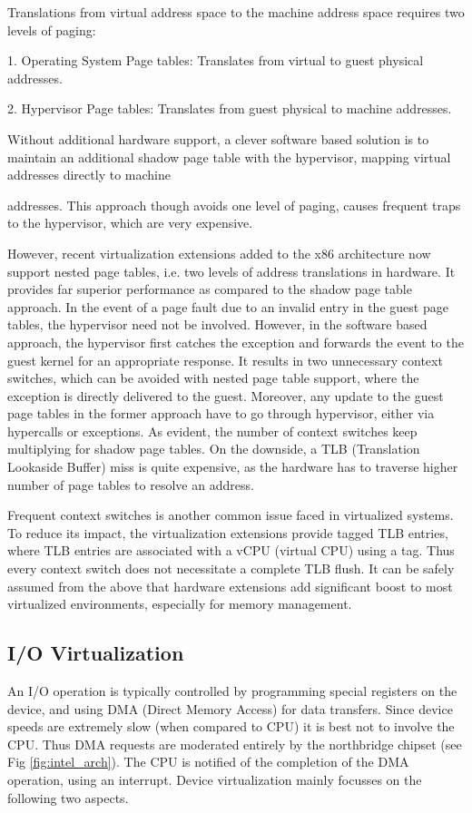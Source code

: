 Translations from virtual address space to the machine address space requires two levels of paging:

1. Operating System Page tables: Translates from virtual to guest physical addresses.

2. Hypervisor Page tables: Translates from guest physical to machine addresses.

Without additional hardware support, a clever software based solution is to maintain an additional shadow page table with the hypervisor, mapping virtual addresses directly to machine

addresses. This approach though avoids one level of paging, causes frequent traps to the hypervisor, which are very expensive.

However, recent virtualization extensions added to the x86 architecture now support nested page tables, i.e. two levels of address translations in hardware. It provides far superior performance as compared to the shadow page table approach. In the event of a page fault due to an invalid entry in the guest page tables, the hypervisor need not be involved. However, in the software based approach, the hypervisor first catches the exception and forwards the event to the guest kernel for an appropriate response. It results in two unnecessary context switches, which can be avoided with nested page table support, where the exception is directly delivered to the guest. Moreover, any update to the guest page tables in the former approach have to go through hypervisor, either via hypercalls or exceptions. As evident, the number of context switches keep multiplying for shadow page tables. On the downside, a TLB (Translation Lookaside Buffer) miss is quite expensive, as the hardware has to traverse higher number of page tables to resolve an address.

Frequent context switches is another common issue faced in virtualized systems. To reduce its impact, the virtualization extensions provide tagged TLB entries, where TLB entries are associated with a vCPU (virtual CPU) using a tag. Thus every context switch does not necessitate a complete TLB flush. It can be safely assumed from the above that hardware extensions add significant boost to most virtualized environments, especially for memory management.

\subsection{I/O Virtualization}
An I/O operation is typically controlled by programming special registers on the device, and using DMA (Direct Memory Access) for data transfers. Since device speeds are extremely slow (when compared to CPU) it is best not to involve the CPU. Thus DMA requests are moderated entirely by the northbridge chipset (see Fig \ref{fig:intel_arch}). The CPU is notified of the completion of the DMA operation, using an interrupt. Device virtualization mainly focusses on the following two aspects.

